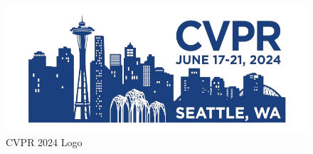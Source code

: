 \documentclass[sigconf, 10pt]{acmart}
\begin{document}
\begin{figure}[h]
	\centering
	\includegraphics[width=\columnwidth]{./appendix/cvpr24-logo.png}
	\caption{CVPR 2024 Logo}
	\label{fig:cvpr24logo}
\end{figure}



\vspace{-3pt}


\end{document}
